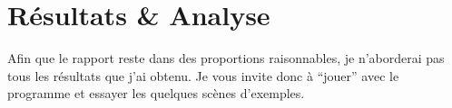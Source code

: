 \chapter{Résultats \& Analyse}
Afin que le rapport reste dans des proportions raisonnables, je n'aborderai
pas tous les résultats que j'ai obtenu. Je vous invite donc à ``jouer'' avec
le programme et essayer les quelques scènes d'exemples.


\clearpage

\clearpage

\clearpage

\clearpage

\clearpage

\clearpage

\clearpage

\clearpage

% 
